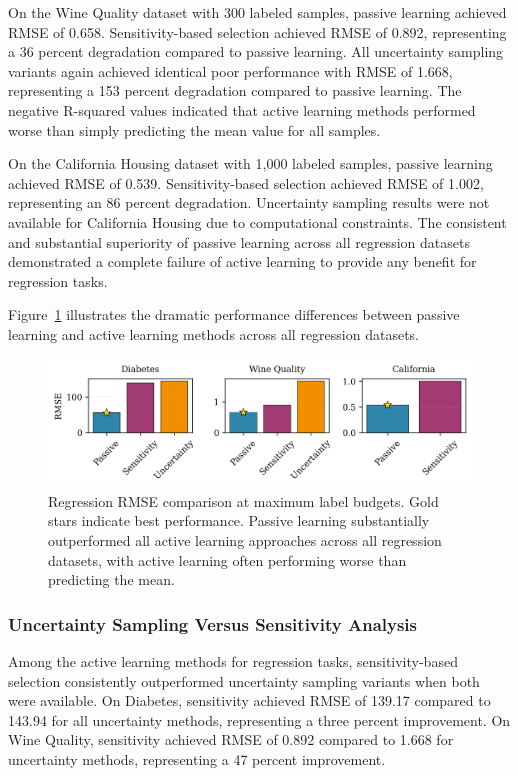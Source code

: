 \documentclass[conference]{IEEEtran}
\begin{document}
On the Wine Quality dataset with 300 labeled samples, passive learning achieved RMSE of 0.658. Sensitivity-based selection achieved RMSE of 0.892, representing a 36 percent degradation compared to passive learning. All uncertainty sampling variants again achieved identical poor performance with RMSE of 1.668, representing a 153 percent degradation compared to passive learning. The negative R-squared values indicated that active learning methods performed worse than simply predicting the mean value for all samples.

On the California Housing dataset with 1,000 labeled samples, passive learning achieved RMSE of 0.539. Sensitivity-based selection achieved RMSE of 1.002, representing an 86 percent degradation. Uncertainty sampling results were not available for California Housing due to computational constraints. The consistent and substantial superiority of passive learning across all regression datasets demonstrated a complete failure of active learning to provide any benefit for regression tasks.

Figure~\ref{fig:reg-comparison} illustrates the dramatic performance differences between passive learning and active learning methods across all regression datasets.

\begin{figure}[t]
\centering
\includegraphics[width=\columnwidth]{figures/reg_final_comparison.png}
\caption{Regression RMSE comparison at maximum label budgets. Gold stars indicate best performance. Passive learning substantially outperformed all active learning approaches across all regression datasets, with active learning often performing worse than predicting the mean.}
\label{fig:reg-comparison}
\end{figure}

\subsubsection{Uncertainty Sampling Versus Sensitivity Analysis}

Among the active learning methods for regression tasks, sensitivity-based selection consistently outperformed uncertainty sampling variants when both were available. On Diabetes, sensitivity achieved RMSE of 139.17 compared to 143.94 for all uncertainty methods, representing a three percent improvement. On Wine Quality, sensitivity achieved RMSE of 0.892 compared to 1.668 for uncertainty methods, representing a 47 percent improvement.
\end{document}
